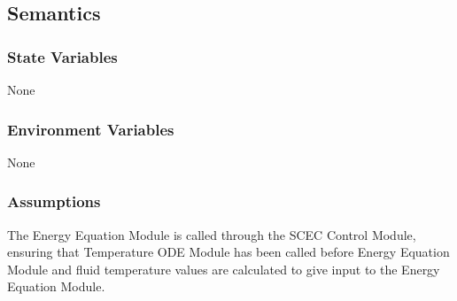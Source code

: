 \documentclass[12pt, titlepage]{article}
\begin{document}
\subsection{Semantics}

\subsubsection{State Variables}

None

\subsubsection{Environment Variables}

None  

\subsubsection{Assumptions}

The Energy Equation Module is called through the SCEC Control Module, ensuring that Temperature ODE Module has been called before Energy Equation Module and fluid temperature values are calculated to give input to the Energy Equation Module.
\end{document}
